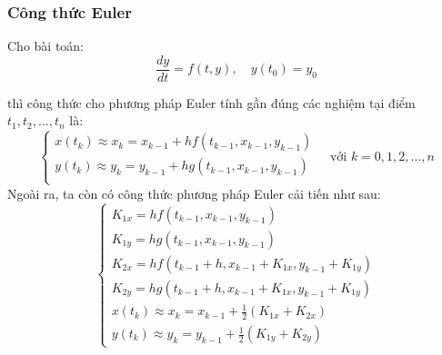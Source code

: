 \documentclass[a4paper,15pt]{article}
\begin{document}
\subsubsection{Công thức Euler}
Cho bài toán:
\[
\frac{dy}{dt} = f(t,y), \quad  y(t_0) = y_0
\]

thì công thức cho phương pháp Euler tính gần đúng các nghiệm tại điểm $t_1,t_2,...,t_n$ là:
\[
\begin{cases}
    x(t_k) \approx x_k = x_{k-1} + h f(t_{k-1}, x_{k-1}, y_{k-1}) \\
    y(t_k) \approx y_k = y_{k-1} + h g(t_{k-1}, x_{k-1}, y_{k-1}) \\
\end{cases}
\quad \text{với } k = 0, 1, 2, \ldots, n
\]
Ngoài ra, ta còn có công thức phương pháp Euler cải tiến như sau:
\[
\begin{cases}
K_{1x} = h f(t_{k-1}, x_{k-1}, y_{k-1}) \\
K_{1y} = h g(t_{k-1}, x_{k-1}, y_{k-1}) \\
K_{2x} = h f(t_{k-1} + h, x_{k-1} + K_{1x}, y_{k-1} + K_{1y}) \\
K_{2y} = h g(t_{k-1} + h, x_{k-1} + K_{1x}, y_{k-1} + K_{1y}) \\
x(t_k) \approx x_k = x_{k-1} + \frac{1}{2}(K_{1x} + K_{2x}) \\
y(t_k) \approx y_k = y_{k-1} + \frac{1}{2}(K_{1y} + K_{2y})
\end{cases}
\]
\end{document}
